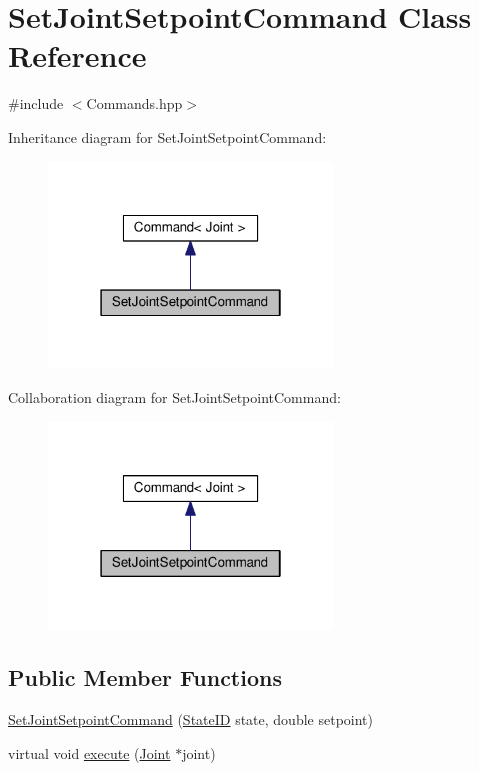 \hypertarget{classSetJointSetpointCommand}{}\section{Set\+Joint\+Setpoint\+Command Class Reference}
\label{classSetJointSetpointCommand}


{\ttfamily \#include $<$Commands.\+hpp$>$}



Inheritance diagram for Set\+Joint\+Setpoint\+Command\+:\nopagebreak
\begin{figure}[H]
\begin{center}
\leavevmode
\includegraphics[width=214pt]{classSetJointSetpointCommand__inherit__graph}
\end{center}
\end{figure}


Collaboration diagram for Set\+Joint\+Setpoint\+Command\+:\nopagebreak
\begin{figure}[H]
\begin{center}
\leavevmode
\includegraphics[width=214pt]{classSetJointSetpointCommand__coll__graph}
\end{center}
\end{figure}
\subsection*{Public Member Functions}
\begin{DoxyCompactItemize}
\item 
\hyperlink{classSetJointSetpointCommand_a96251fb343095fe29ba190f43e557733}{Set\+Joint\+Setpoint\+Command} (\hyperlink{States_8hpp_a26aafbeccd8f356b39e1809f1ab9cfdc}{State\+ID} state, double setpoint)
\item 
virtual void \hyperlink{classSetJointSetpointCommand_a7f1341d238595b02a660fb55aef9bc45}{execute} (\hyperlink{classJoint}{Joint} $\ast$joint)
\end{DoxyCompactItemize}


